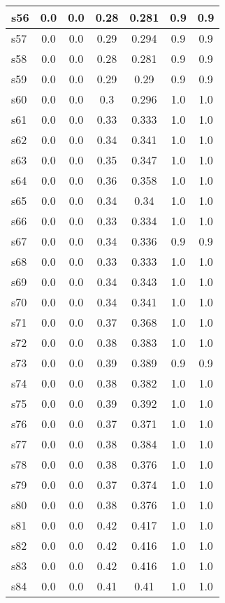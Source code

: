 \documentclass{article}
\begin{document}
\begin{tabular}{|l|c|c|c|c|c|c|}
\hline
s56 &0.0 & 0.0 & 0.28 & 0.281 & 0.9 & 0.9\\
\hline
s57 &0.0 & 0.0 & 0.29 & 0.294 & 0.9 & 0.9\\
\hline
s58 &0.0 & 0.0 & 0.28 & 0.281 & 0.9 & 0.9\\
\hline
s59 &0.0 & 0.0 & 0.29 & 0.29 & 0.9 & 0.9\\
\hline
s60 &0.0 & 0.0 & 0.3 & 0.296 & 1.0 & 1.0\\
\hline
s61 &0.0 & 0.0 & 0.33 & 0.333 & 1.0 & 1.0\\
\hline
s62 &0.0 & 0.0 & 0.34 & 0.341 & 1.0 & 1.0\\
\hline
s63 &0.0 & 0.0 & 0.35 & 0.347 & 1.0 & 1.0\\
\hline
s64 &0.0 & 0.0 & 0.36 & 0.358 & 1.0 & 1.0\\
\hline
s65 &0.0 & 0.0 & 0.34 & 0.34 & 1.0 & 1.0\\
\hline
s66 &0.0 & 0.0 & 0.33 & 0.334 & 1.0 & 1.0\\
\hline
s67 &0.0 & 0.0 & 0.34 & 0.336 & 0.9 & 0.9\\
\hline
s68 &0.0 & 0.0 & 0.33 & 0.333 & 1.0 & 1.0\\
\hline
s69 &0.0 & 0.0 & 0.34 & 0.343 & 1.0 & 1.0\\
\hline
s70 &0.0 & 0.0 & 0.34 & 0.341 & 1.0 & 1.0\\
\hline
s71 &0.0 & 0.0 & 0.37 & 0.368 & 1.0 & 1.0\\
\hline
s72 &0.0 & 0.0 & 0.38 & 0.383 & 1.0 & 1.0\\
\hline
s73 &0.0 & 0.0 & 0.39 & 0.389 & 0.9 & 0.9\\
\hline
s74 &0.0 & 0.0 & 0.38 & 0.382 & 1.0 & 1.0\\
\hline
s75 &0.0 & 0.0 & 0.39 & 0.392 & 1.0 & 1.0\\
\hline
s76 &0.0 & 0.0 & 0.37 & 0.371 & 1.0 & 1.0\\
\hline
s77 &0.0 & 0.0 & 0.38 & 0.384 & 1.0 & 1.0\\
\hline
s78 &0.0 & 0.0 & 0.38 & 0.376 & 1.0 & 1.0\\
\hline
s79 &0.0 & 0.0 & 0.37 & 0.374 & 1.0 & 1.0\\
\hline
s80 &0.0 & 0.0 & 0.38 & 0.376 & 1.0 & 1.0\\
\hline
s81 &0.0 & 0.0 & 0.42 & 0.417 & 1.0 & 1.0\\
\hline
s82 &0.0 & 0.0 & 0.42 & 0.416 & 1.0 & 1.0\\
\hline
s83 &0.0 & 0.0 & 0.42 & 0.416 & 1.0 & 1.0\\
\hline
s84 &0.0 & 0.0 & 0.41 & 0.41 & 1.0 & 1.0\\

\end{tabular}
\end{document}
